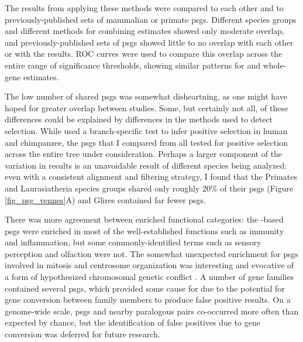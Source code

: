 The results from applying these methods were compared to each other
and to previously-published sets of mammalian or primate
\acfp{psg}. Different species groups and different methods for
combining \sw estimates showed only moderate overlap, and
previously-published sets of \acp{psg} showed little to no overlap
with each other or with the \sw results. ROC curves were used to
compare this overlap across the entire range of significance
thresholds, showing similar patterns for \sw \pvs and whole-gene \dnds
estimates.

The low number of shared \acp{psg} was somewhat disheartning, as one
might have hoped for greater overlap between studies. Some, but
certainly not all, of these differences could be explained by
differences in the methods used to detect selection. While
\citet{Clark2003} used a branch-specific test to infer positive
selection in human and chimpanzee, the \acp{psg} that I compared from
\citet{Nielsen2005,Macaque2007,Kosiol2008} all tested for positive
selection across the entire tree under consideration. Perhaps a larger
component of the variation in results is an unavoidable result of
different species being analyzed: even with a consistent alignment and
filtering strategy, I found that the Primates and Laurasiatheria
species groups shared only roughly 20\% of their \acp{psg} (Figure
\ref{fig_psg_vennes}A) and Glires contained far fewer \acp{psg}.

There was more agreement between enriched functional categories: the
\sw-based \acp{psg} were enriched in most of the well-established
functions such as immunity and inflammation, but some
commonly-identified terms such as sensory perception and olfaction
were not. The somewhat unexpected enrichment for \acp{psg} involved in
mitosis and centrosome organization was interesting and evocative of a
form of hypothesized chromosomal genetic conflict \citep{Malik2002}. A
number of gene families contained several \acp{psg}, which provided
some cause for due to the potential for gene conversion between family
members to produce false positive results. On a genome-wide scale,
\acp{psg} and nearby paralogous pairs co-occurred more often than
expected by chance, but the identification of false positives due to
gene conversion was deferred for future research.


